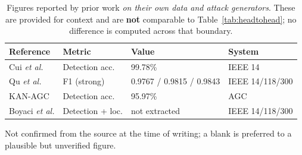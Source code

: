 \begin{table}[!t]
\caption{Figures reported by prior work \emph{on their own data and attack
generators}. These are provided for context and are \textbf{not} comparable to
Table~\ref{tab:headtohead}; no difference is computed across that boundary.}
\label{tab:reported}
\centering
\begin{threeparttable}
\begin{tabular}{@{}llll@{}}
\toprule
Reference & Metric & Value & System \\
\midrule
Cui \textit{et al.} \cite{cui2025} & Detection acc. & 99.78\% & IEEE 14 \\
Qu \textit{et al.} \cite{qu2024} & F1 (strong) & 0.9767 / 0.9815 / 0.9843
  & IEEE 14/118/300 \\
KAN-AGC \cite{kanagc2025} & Detection acc. & 95.97\% & AGC \\
Boyaci \textit{et al.} \cite{boyaci2022} & Detection + loc. & not extracted\tnote{a}
  & IEEE 14/118/300 \\
\bottomrule
\end{tabular}
\begin{tablenotes}\footnotesize
\item[a] Not confirmed from the source at the time of writing; a blank is
preferred to a plausible but unverified figure.
\end{tablenotes}
\end{threeparttable}
\end{table}



